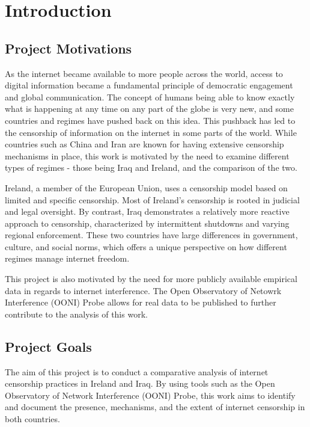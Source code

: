 \chapter{Introduction}

\section{Project Motivations}

As the internet became available to more people across the world, access to digital information became a fundamental principle of democratic engagement and global communication. The concept of humans being able to know exactly what is happening at any time on any part of the globe is very new, and some countries and regimes have pushed back on this idea. This pushback has led to the censorship of information on the internet in some parts of the world. While countries such as China and Iran are known for having extensive censorship mechanisms in place, this work is motivated by the need to examine different types of regimes - those being Iraq and Ireland, and the comparison of the two.

Ireland, a member of the European Union, uses a censorship model based on limited and specific censorship. Most of Ireland's censorship is rooted in judicial and legal oversight. By contrast, Iraq demonstrates a relatively more reactive approach to censorship, characterized by intermittent shutdowns and varying regional enforcement. These two countries have large differences in government, culture, and social norms, which offers a unique perspective on how different regimes manage internet freedom.

This project is also motivated by the need for more publicly available empirical data in regards to internet interference. The Open Observatory of Netowrk Interference (OONI) Probe allows for real data to be published to further contribute to the analysis of this work. 

\section{Project Goals}

The aim of this project is to conduct a comparative analysis of internet censorship practices in Ireland and Iraq. By using tools such as the Open Observatory of Network Interference (OONI) Probe, this work aims to identify and document the presence, mechanisms, and the extent of internet censorship in both countries.


